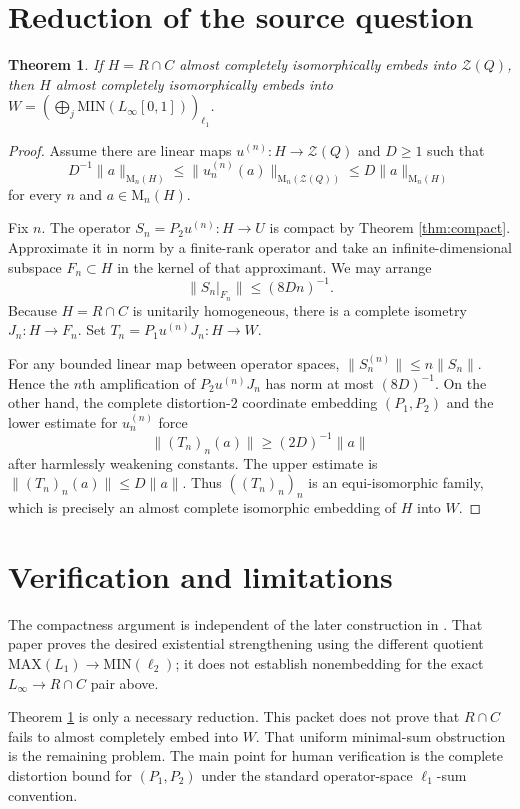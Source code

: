 \documentclass[11pt]{article}
\newtheorem{theorem}{Theorem}
\newcommand{\MIN}{\mathrm{MIN}}
\newcommand{\MAX}{\mathrm{MAX}}
\newcommand{\cZ}{\mathcal Z}
\newcommand{\M}{\mathrm M}
\begin{document}
\section{Reduction of the source question}

\begin{theorem}\label{thm:reduction}
If $H=R\cap C$ almost completely isomorphically embeds into $\cZ(Q)$, then
$H$ almost completely isomorphically embeds into
$W=(\bigoplus_j\MIN(L_\infty[0,1]))_{\ell_1}$.
\end{theorem}

\begin{proof}
Assume there are linear maps $u^{(n)}:H\to\cZ(Q)$ and $D\geq1$ such that
\[
 D^{-1}\|a\|_{\M_n(H)}\leq
 \|u^{(n)}_n(a)\|_{\M_n(\cZ(Q))}\leq
 D\|a\|_{\M_n(H)}
\]
for every $n$ and $a\in\M_n(H)$.

Fix $n$.  The operator $S_n=P_2u^{(n)}:H\to U$ is compact by Theorem
\ref{thm:compact}.  Approximate it in norm by a finite-rank operator and take
an infinite-dimensional subspace $F_n\subset H$ in the kernel of that
approximant.  We may arrange
\[
 \|S_n|_{F_n}\|\leq (8Dn)^{-1}.
\]
Because $H=R\cap C$ is unitarily homogeneous, there is a complete isometry
$J_n:H\to F_n$.  Set $T_n=P_1u^{(n)}J_n:H\to W$.

For any bounded linear map between operator spaces,
$\|S_n^{(n)}\|\leq n\|S_n\|$.  Hence the $n$th amplification of
$P_2u^{(n)}J_n$ has norm at most $(8D)^{-1}$.  On the other hand, the complete
distortion-$2$ coordinate embedding $(P_1,P_2)$ and the lower estimate for
$u^{(n)}_n$ force
\[
 \|(T_n)_n(a)\|\geq (2D)^{-1}\|a\|
\]
after harmlessly weakening constants.  The upper estimate is
$\|(T_n)_n(a)\|\leq D\|a\|$.  Thus $((T_n)_n)_n$ is an equi-isomorphic family,
which is precisely an almost complete isomorphic embedding of $H$ into $W$.
\end{proof}

\section{Verification and limitations}

The compactness argument is independent of the later construction in
\cite{BragaOikhberg2022}.  That paper proves the desired existential
strengthening using the different quotient
$\MAX(L_1)\to\MIN(\ell_2)$; it does not establish nonembedding for the exact
$L_\infty\to R\cap C$ pair above.

Theorem \ref{thm:reduction} is only a necessary reduction.  This packet does
not prove that $R\cap C$ fails to almost completely embed into $W$.  That
uniform minimal-sum obstruction is the remaining problem.  The main point for
human verification is the complete distortion bound for $(P_1,P_2)$ under the
standard operator-space $\ell_1$-sum convention.
\end{document}
